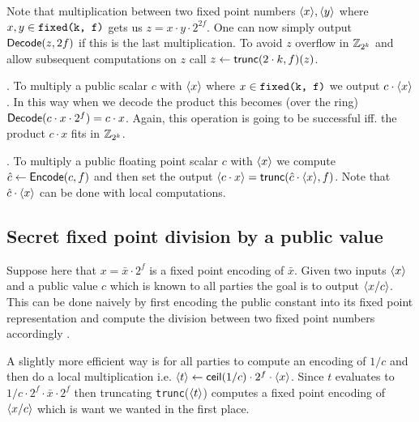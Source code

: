  Note that
multiplication between two fixed point numbers $\langle {x} \rangle, \langle {y} \rangle$ where
$x,y \in \verb|fixed(k, f)|$ gets us $z = x \cdot y \cdot 2^{2f}$. One can
now simply output $\mathsf{Decode}(z, 2f)$ if this is the last multiplication.
To avoid $z$ overflow in $\mathbb{Z}_{2^k}$ and allow
subsequent computations on $z$ call $z \gets \mathsf{trunc}(2 \cdot k, f)(z)$.

.
To multiply a public scalar
$c$ with $\langle {x} \rangle$ where $x \in \verb|fixed(k, f)|$ we output
$c \cdot \langle {x} \rangle$. In this way when we decode the product
this becomes (over the ring)
$\mathsf{Decode}(c \cdot x \cdot 2^f) = c \cdot x$. Again, this operation is going to
be successful iff. the product $c \cdot x$ fits in $\mathbb{Z}_{2^k}$.

. To multiply a
public floating point scalar $c$ with $\langle {x} \rangle$ we compute $\hat{c} \gets
\mathsf{Encode}(c, f)$ and then set the output $\langle {c \cdot x} \rangle =
\mathsf{trunc}(\hat{c} \cdot \langle {x} \rangle, f)$. Note that $\hat{c} \cdot \langle {x} \rangle$
can be done with local computations.


\subsection{Secret fixed point division by a public value}

Suppose here that $x = \bar{x} \cdot 2^f$ is a fixed point encoding of $\bar{x}$. 
Given two inputs $\langle {x} \rangle$ and a public value $c$ which is known to all parties the goal is to output $\langle {x /c} \rangle$.
This can be done naively by first encoding the public constant into its fixed point representation and compute the division between two fixed point numbers accordingly \cite{FC:CatSax10,SCN:CatDeH10}.

A slightly more efficient way is for all parties to compute an encoding of $1/c$
and then do a local multiplication i.e. $\langle {t} \rangle \gets \mathsf{ceil}(1/c) \cdot 2^f \cdot \langle {x} \rangle$.
Since $t$ evaluates to $1/c \cdot 2^f \cdot \bar{x} \cdot 2^f$ then truncating \verb|trunc|($\langle {t} \rangle$) computes a fixed point encoding of $\langle {x/c} \rangle$ which is want we wanted in the first place.


